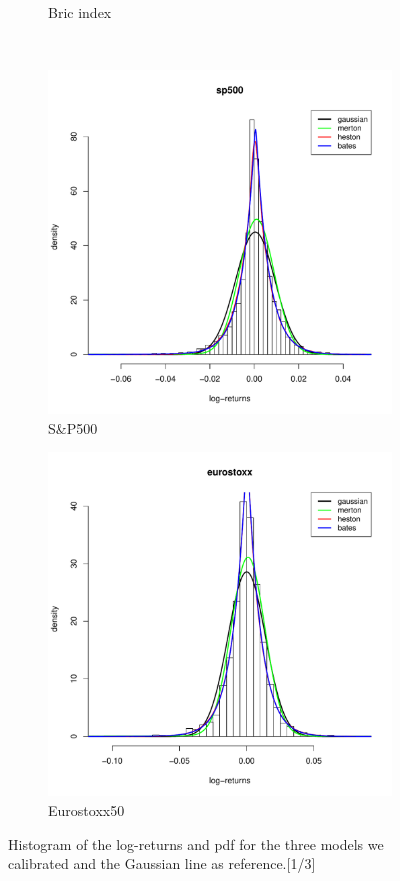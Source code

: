 \begin{figure}
\begin{subfigure}{0.44\textwidth}
		\caption{Bric index}
	\end{subfigure}
	\\
	\begin{subfigure}{0.44\textwidth}
		\centering
		\includegraphics[width=\linewidth]{Images/hist_sp500.pdf}
		\caption{S\&P500}
	\end{subfigure}
	\begin{subfigure}{0.44\textwidth}
		\centering
		\includegraphics[width=\linewidth]{Images/hist_eurostoxx.pdf}
		\caption{Eurostoxx50}
	\end{subfigure}
	\caption{Histogram of the log-returns and pdf for the three models we calibrated and the Gaussian line as reference.[1/3]}
	\label{fig:hist_1}
\end{figure}





